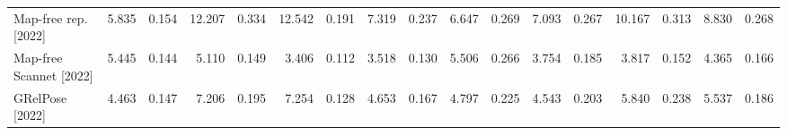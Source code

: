 \begin{table}[h!]
\begin{tabular}{lrrrrrrrrrrrrrrrr}
Map-free rep. [2022]\cite{arnold2022map} & {\cellcolor[HTML]{FFF0A6}} \color[HTML]{000000} 5.835 & {\cellcolor[HTML]{91D068}} \color[HTML]{000000} 0.154 & {\cellcolor[HTML]{AD0826}} \color[HTML]{F1F1F1} 12.207 & {\cellcolor[HTML]{F46D43}} \color[HTML]{F1F1F1} 0.334 & {\cellcolor[HTML]{A50026}} \color[HTML]{F1F1F1} 12.542 & {\cellcolor[HTML]{FEC877}} \color[HTML]{000000} 0.191 & {\cellcolor[HTML]{FCAA5F}} \color[HTML]{000000} 7.319 & {\cellcolor[HTML]{FEDE89}} \color[HTML]{000000} 0.237 & {\cellcolor[HTML]{FFF2AA}} \color[HTML]{000000} 6.647 & {\cellcolor[HTML]{FFF0A6}} \color[HTML]{000000} 0.269 & {\cellcolor[HTML]{FED27F}} \color[HTML]{000000} 7.093 & {\cellcolor[HTML]{FAFDB8}} \color[HTML]{000000} 0.267 & {\cellcolor[HTML]{F88C51}} \color[HTML]{F1F1F1} 10.167 & {\cellcolor[HTML]{F98E52}} \color[HTML]{F1F1F1} 0.313 & {\cellcolor[HTML]{F88950}} \color[HTML]{F1F1F1} 8.830 & {\cellcolor[HTML]{FEE08B}} \color[HTML]{000000} 0.268 \\
Map-free Scannet [2022]\cite{arnold2022map} & {\cellcolor[HTML]{F5FBB2}} \color[HTML]{000000} 5.445 & {\cellcolor[HTML]{63BC62}} \color[HTML]{F1F1F1} 0.144 & {\cellcolor[HTML]{0C7F43}} \color[HTML]{F1F1F1} 5.110 & {\cellcolor[HTML]{07753E}} \color[HTML]{F1F1F1} 0.149 & {\cellcolor[HTML]{006837}} \color[HTML]{F1F1F1} {\cellcolor{blue}} 3.406 & {\cellcolor[HTML]{006837}} \color[HTML]{F1F1F1} {\cellcolor{blue}} 0.112 & {\cellcolor[HTML]{0E8245}} \color[HTML]{F1F1F1} 3.518 & {\cellcolor[HTML]{006837}} \color[HTML]{F1F1F1} {\cellcolor{blue}} 0.130 & {\cellcolor[HTML]{BFE47A}} \color[HTML]{000000} 5.506 & {\cellcolor[HTML]{FFF5AE}} \color[HTML]{000000} 0.266 & {\cellcolor[HTML]{33A456}} \color[HTML]{F1F1F1} 3.754 & {\cellcolor[HTML]{57B65F}} \color[HTML]{F1F1F1} 0.185 & {\cellcolor[HTML]{006837}} \color[HTML]{F1F1F1} {\cellcolor{blue}} 3.817 & {\cellcolor[HTML]{006837}} \color[HTML]{F1F1F1} {\cellcolor{blue}} 0.152 & {\cellcolor[HTML]{15904C}} \color[HTML]{F1F1F1} 4.365 & {\cellcolor[HTML]{0B7D42}} \color[HTML]{F1F1F1} 0.166 \\
GRelPose [2022]\cite{khatib2022grelpose} & {\cellcolor[HTML]{9BD469}} \color[HTML]{000000} 4.463 & {\cellcolor[HTML]{73C264}} \color[HTML]{000000} 0.147 & {\cellcolor[HTML]{B3DF72}} \color[HTML]{000000} 7.206 & {\cellcolor[HTML]{73C264}} \color[HTML]{000000} 0.195 & {\cellcolor[HTML]{E0F295}} \color[HTML]{000000} 7.254 & {\cellcolor[HTML]{30A356}} \color[HTML]{F1F1F1} 0.128 & {\cellcolor[HTML]{84CA66}} \color[HTML]{000000} 4.653 & {\cellcolor[HTML]{6BBF64}} \color[HTML]{000000} 0.167 & {\cellcolor[HTML]{78C565}} \color[HTML]{000000} 4.797 & {\cellcolor[HTML]{ABDB6D}} \color[HTML]{000000} 0.225 & {\cellcolor[HTML]{87CB67}} \color[HTML]{000000} 4.543 & {\cellcolor[HTML]{84CA66}} \color[HTML]{000000} 0.203 & {\cellcolor[HTML]{7FC866}} \color[HTML]{000000} 5.840 & {\cellcolor[HTML]{D9EF8B}} \color[HTML]{000000} 0.238 & {\cellcolor[HTML]{8CCD67}} \color[HTML]{000000} 5.537 & {\cellcolor[HTML]{3FAA59}} \color[HTML]{F1F1F1} 0.186 \\

\end{tabular}
\end{table}
